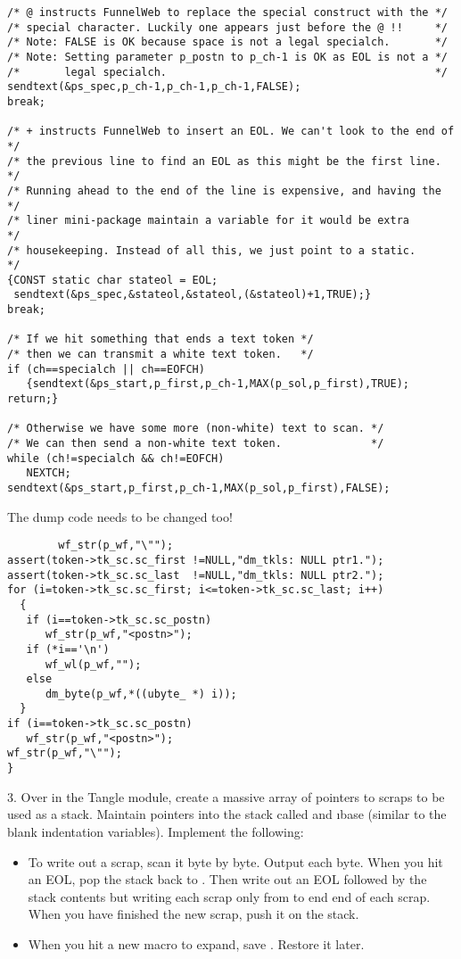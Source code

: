 \begin{verbatim}
/* @ instructs FunnelWeb to replace the special construct with the */
/* special character. Luckily one appears just before the @ !!     */
/* Note: FALSE is OK because space is not a legal specialch.       */
/* Note: Setting parameter p_postn to p_ch-1 is OK as EOL is not a */
/*       legal specialch.                                          */
sendtext(&ps_spec,p_ch-1,p_ch-1,p_ch-1,FALSE);
break;

/* + instructs FunnelWeb to insert an EOL. We can't look to the end of */
/* the previous line to find an EOL as this might be the first line.   */
/* Running ahead to the end of the line is expensive, and having the   */
/* liner mini-package maintain a variable for it would be extra        */
/* housekeeping. Instead of all this, we just point to a static.       */
{CONST static char stateol = EOL;
 sendtext(&ps_spec,&stateol,&stateol,(&stateol)+1,TRUE);}
break;

/* If we hit something that ends a text token */
/* then we can transmit a white text token.   */
if (ch==specialch || ch==EOFCH)
   {sendtext(&ps_start,p_first,p_ch-1,MAX(p_sol,p_first),TRUE); return;}
    
/* Otherwise we have some more (non-white) text to scan. */
/* We can then send a non-white text token.              */
while (ch!=specialch && ch!=EOFCH)
   NEXTCH;
sendtext(&ps_start,p_first,p_ch-1,MAX(p_sol,p_first),FALSE);
\end{verbatim}

The dump code needs to be changed too!

\begin{verbatim}
        wf_str(p_wf,"\"");
assert(token->tk_sc.sc_first !=NULL,"dm_tkls: NULL ptr1.");
assert(token->tk_sc.sc_last  !=NULL,"dm_tkls: NULL ptr2.");
for (i=token->tk_sc.sc_first; i<=token->tk_sc.sc_last; i++)
  {
   if (i==token->tk_sc.sc_postn)
      wf_str(p_wf,"<postn>");
   if (*i=='\n')
      wf_wl(p_wf,"");
   else
      dm_byte(p_wf,*((ubyte_ *) i));
  }
if (i==token->tk_sc.sc_postn)
   wf_str(p_wf,"<postn>");
wf_str(p_wf,"\"");
}
\end{verbatim}

3. Over in the Tangle module, create a massive array of pointers to scraps
to be used as a stack. Maintain pointers into the stack called  and
\i{base} (similar to the blank indentation variables). Implement the following:

\begin{itemize}

\item To write out a scrap, scan it byte by byte. Output each byte. When
you hit an EOL, pop the stack back to . Then write out an EOL
followed by the stack contents but writing each scrap only from  to
end end of each scrap.
When you have finished the new scrap, push it on the stack.

\item When you hit a new macro to expand, save . Restore it later.   

\end{itemize}

